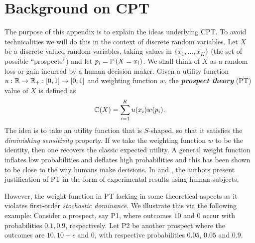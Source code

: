 

\appendices


\section{Background on CPT}
\label{sec:appendix-cpt-intro}
The purpose of this appendix is to explain the ideas underlying CPT. 
To avoid technicalities we will do this in the context of discrete random variables.
Let $X$ be a discrete valued random variables, taking values in $\{x_1,\dots,x_K\}$ (the set of possible ``prospects'') 
and let $p_i = \mathbb{P}\left( X=x_i \right)$.
We shall think of $X$ as a random loss or gain incurred by a human decision maker.
Given a utility function $u:\mathbb{R}\rightarrow \mathbb{R}_+:[0,1] \rightarrow [0,1]$ and weighting function $w$, 
the \textit{\textbf{prospect theory}} (PT) value of $X$ is defined as 
\begin{align}
\mathbb{C}(X) = \sum_{i=1}^K u(x_i) w(p_i).
\label{eq:ptval}
\end{align} 
The idea is to take an utility function that is $S$-shaped, so that it satisfies the \textit{diminishing sensitivity}  property. 
If we take the weighting function $w$ to be the identity, then one recovers the classic expected utility. A general weight function inflates low probabilities and deflates high probabilities and this has been shown to be close to the way humans make decisions. 
In \cite{kahneman1979prospect} and \cite{fennema1997original}, the authors present justification of PT in the form of experimental results  using human subjects.

However, the weight function in PT  lacking in some theoretical aspects as it violates first-order \textit{stochastic dominance}. We illustrate this via the following example: Consider a prospect, say P1, where outcomes $10$ and $0$ occur with probabilities $0.1,  0.9$, respectively. Let P2 be another prospect  where the outcomes are $10, 10+\epsilon$ and $0$, with respective probabilities $0.05$, $0.05$ and $0.9$.

